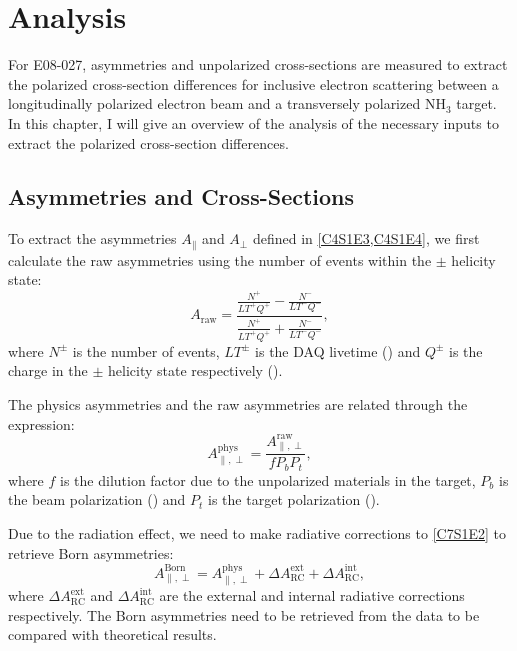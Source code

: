 
\chapter{Analysis}
\label{C7}

For E08-027, asymmetries and unpolarized cross-sections are measured to extract the polarized cross-section differences for inclusive electron scattering between a longitudinally polarized electron beam and a transversely polarized NH${}_3$ target. In this chapter, I will give an overview of the analysis of the necessary inputs to extract the polarized cross-section differences.

\section{Asymmetries and Cross-Sections}
\label{C7S1}

To extract the asymmetries $A_{\parallel}$ and $A_\perp$ defined in \cref{C4S1E3,C4S1E4}, we first calculate the raw asymmetries using the number of events within the $\pm$ helicity state:
\begin{equation} \label{C7S1E1}
A_{\mathrm{raw}}=\frac{\frac{N^+}{LT^+Q^+}-\frac{N^-}{LT^-Q^-}}{\frac{N^+}{LT^+Q^+}+\frac{N^-}{LT^-Q^-}},
\end{equation}
where $N^\pm$ is the number of events, $LT^{\pm}$ is the DAQ livetime () and $Q^\pm$ is the charge in the $\pm$ helicity state respectively ().

The physics asymmetries and the raw asymmetries are related through the expression:
\begin{equation} \label{C7S1E2}
A_{\parallel,\perp}^{\mathrm{phys}}=\frac{A_{\parallel,\perp}^{\mathrm{raw}}}{fP_bP_t},
\end{equation}
where $f$ is the dilution factor due to the unpolarized materials in the target, $P_b$ is the beam polarization () and $P_t$ is the target polarization ().

Due to the radiation effect, we need to make radiative corrections to \cref{C7S1E2} to retrieve Born asymmetries:
\begin{equation} \label{C7S1E3}
A_{\parallel,\perp}^{\mathrm{Born}}=A_{\parallel,\perp}^{\mathrm{phys}}+\Delta A_{\mathrm{RC}}^{\mathrm{ext}}+\Delta A_{\mathrm{RC}}^{\mathrm{int}},
\end{equation}
where $\Delta A_{\mathrm{RC}}^{\mathrm{ext}}$ and $\Delta A_{\mathrm{RC}}^{\mathrm{int}}$ are the external and internal radiative corrections respectively. The Born asymmetries need to be retrieved from the data to be compared with theoretical results.

